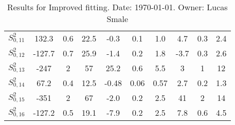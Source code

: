 \documentclass{article}
\begin{document}
\begin{landscape}
\begin{table}[ht]
\begin{tabular}{c||c|c|c||c|c|c||c|c|c}
$S^2_{0,11}$& 132.3 & 0.6 & 22.5 & -0.3 & 0.1 & 1.0 & 4.7 & 0.3 & 2.4 \\
$S^2_{0,12}$& -127.7 & 0.7 & 25.9 & -1.4 & 0.2 & 1.8 & -3.7 & 0.3 & 2.6 \\
$S^2_{0,13}$& -247 & 2 & 57 & 25.2 & 0.6 & 5.5 & 3 & 1 & 12 \\
$S^2_{0,14}$& 67.2 & 0.4 & 12.5 & -0.48 & 0.06 & 0.57 & 2.7 & 0.2 & 1.3 \\
$S^2_{0,15}$& -351 & 2 & 67 & -2.0 & 0.2 & 2.5 & 41 & 2 & 14 \\
$S^2_{0,16}$& -127.2 & 0.5 & 19.1 & -7.9 & 0.2 & 2.5 & 7.8 & 0.6 & 4.5 \\
\hline
    \end{tabular}
    \caption{Results for Improved fitting. Date: \today. Owner: Lucas Smale}
\end{table}
\end{landscape}
\end{document}
